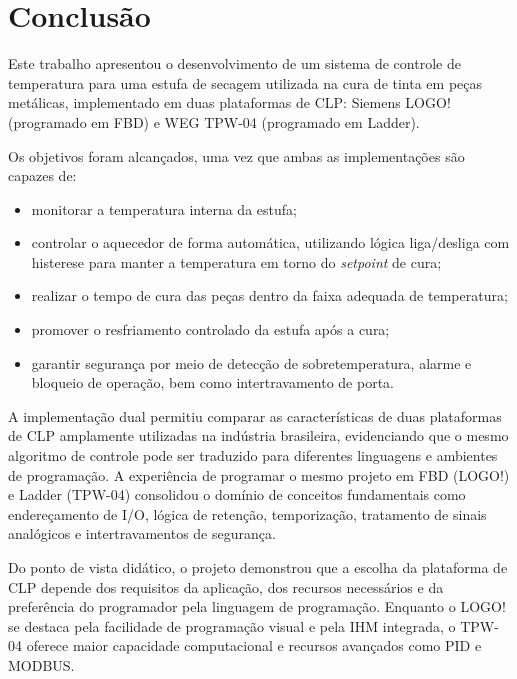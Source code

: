 \documentclass[
  12pt,
  openright,
  oneside,
  a4paper,
  chapter=TITLE,
  section=TITLE,
  brazilian
]{abntex2}
\begin{document}
\chapter{Conclus\~{a}o}

Este trabalho apresentou o desenvolvimento de um sistema de controle de temperatura para uma estufa de secagem utilizada na cura de tinta em pe\c{c}as met\'{a}licas, implementado em duas plataformas de CLP: Siemens LOGO! (programado em FBD) e WEG TPW-04 (programado em Ladder).

Os objetivos foram alcan\c{c}ados, uma vez que ambas as implementa\c{c}\~{o}es s\~{a}o capazes de:

\begin{itemize}
    \item monitorar a temperatura interna da estufa;
    \item controlar o aquecedor de forma autom\'{a}tica, utilizando l\'{o}gica liga/desliga com histerese para manter a temperatura em torno do \textit{setpoint} de cura;
    \item realizar o tempo de cura das pe\c{c}as dentro da faixa adequada de temperatura;
    \item promover o resfriamento controlado da estufa ap\'{o}s a cura;
    \item garantir seguran\c{c}a por meio de detec\c{c}\~{a}o de sobretemperatura, alarme e bloqueio de opera\c{c}\~{a}o, bem como intertravamento de porta.
\end{itemize}

A implementa\c{c}\~{a}o dual permitiu comparar as caracter\'{i}sticas de duas plataformas de CLP amplamente utilizadas na ind\'{u}stria brasileira, evidenciando que o mesmo algoritmo de controle pode ser traduzido para diferentes linguagens e ambientes de programa\c{c}\~{a}o. A experi\^{e}ncia de programar o mesmo projeto em FBD (LOGO!) e Ladder (TPW-04) consolidou o dom\'{i}nio de conceitos fundamentais como endere\c{c}amento de I/O, l\'{o}gica de reten\c{c}\~{a}o, temporiza\c{c}\~{a}o, tratamento de sinais anal\'{o}gicos e intertravamentos de seguran\c{c}a.

Do ponto de vista did\'{a}tico, o projeto demonstrou que a escolha da plataforma de CLP depende dos requisitos da aplica\c{c}\~{a}o, dos recursos necess\'{a}rios e da prefer\^{e}ncia do programador pela linguagem de programa\c{c}\~{a}o. Enquanto o LOGO! se destaca pela facilidade de programa\c{c}\~{a}o visual e pela IHM integrada, o TPW-04 oferece maior capacidade computacional e recursos avan\c{c}ados como PID e MODBUS.
\end{document}
